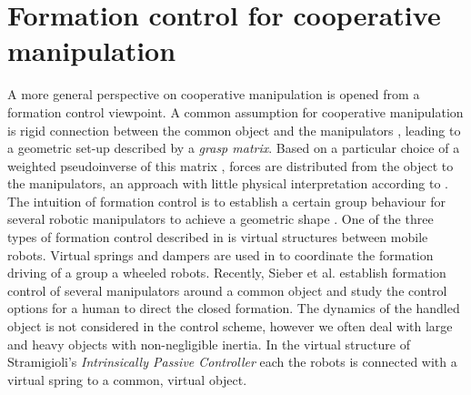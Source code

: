 \documentclass[a4paper,twoside, openright,12pt]{report}
\begin{document}
\section{Formation control for cooperative manipulation}
A more general perspective on cooperative manipulation is opened from a formation control viewpoint. A common assumption for cooperative manipulation is rigid connection between the common object and the manipulators \cite{CoopManipHandbook}, leading to a geometric set-up described by a \emph{grasp matrix}. Based on a particular choice of a weighted pseudoinverse of this matrix \cite{Walker_91},\cite{Erhart_15} forces are distributed from the object to the manipulators, an approach with little physical interpretation according to \cite{Wimboeck_08}. The intuition of formation control is to establish a certain group behaviour for several robotic manipulators to achieve a geometric shape \cite{VosDiss_15}. One of the three types of formation control described in \cite{Lawton_03} is virtual structures between mobile robots. Virtual springs and dampers are used in \cite{Vos_14} to coordinate the formation driving of a group a wheeled robots. Recently, Sieber et al. \cite{Sieber_15} establish formation control of several manipulators around a common object and study the control options for a human to direct the closed formation. The dynamics of the handled object is not considered in the control scheme, however we often deal with large and heavy objects with non-negligible inertia. In the virtual structure of Stramigioli's \emph{Intrinsically Passive Controller} each the robots is connected with a virtual spring to a common, virtual object.
\end{document}
